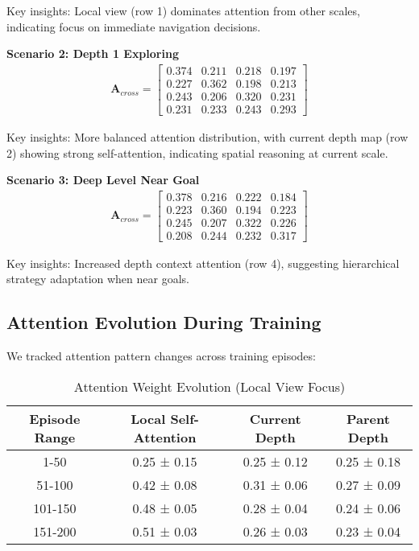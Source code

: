 \documentclass[11pt]{article}
\begin{document}
Key insights: Local view (row 1) dominates attention from other scales, indicating focus on immediate navigation decisions.

\textbf{Scenario 2: Depth 1 Exploring}
\begin{align}
\mathbf{A}_{cross} = \begin{bmatrix}
0.374 & 0.211 & 0.218 & 0.197 \\
0.227 & 0.362 & 0.198 & 0.213 \\
0.243 & 0.206 & 0.320 & 0.231 \\
0.231 & 0.233 & 0.243 & 0.293
\end{bmatrix}
\end{align}

Key insights: More balanced attention distribution, with current depth map (row 2) showing strong self-attention, indicating spatial reasoning at current scale.

\textbf{Scenario 3: Deep Level Near Goal}
\begin{align}
\mathbf{A}_{cross} = \begin{bmatrix}
0.378 & 0.216 & 0.222 & 0.184 \\
0.223 & 0.360 & 0.194 & 0.223 \\
0.245 & 0.207 & 0.322 & 0.226 \\
0.208 & 0.244 & 0.232 & 0.317
\end{bmatrix}
\end{align}

Key insights: Increased depth context attention (row 4), suggesting hierarchical strategy adaptation when near goals.

\subsection{Attention Evolution During Training}

We tracked attention pattern changes across training episodes:

\begin{table}[h]
\centering
\caption{Attention Weight Evolution (Local View Focus)}
\begin{tabular}{cccc}
\toprule
Episode Range & Local Self-Attention & Current Depth & Parent Depth \\
\midrule
1-50 & 0.25 ± 0.15 & 0.25 ± 0.12 & 0.25 ± 0.18 \\
51-100 & 0.42 ± 0.08 & 0.31 ± 0.06 & 0.27 ± 0.09 \\
101-150 & 0.48 ± 0.05 & 0.28 ± 0.04 & 0.24 ± 0.06 \\
151-200 & 0.51 ± 0.03 & 0.26 ± 0.03 & 0.23 ± 0.04 \\
\bottomrule
\end{tabular}
\end{table}
\end{document}
